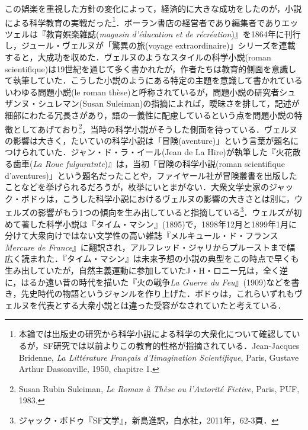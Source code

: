 この娯楽を重視した方針の変化によって，経済的に大きな成功をしたのが，小説による科学教育の実戦だった\footnote{本論では出版史の研究から科学小説による科学の大衆化について確認しているが，SF研究では以前よりこの教育的性格が指摘されている．Jean-Jacques Bridenne, \emph{La Littérature Français d'Iimagination Scientifique}, Paris, Gustave Arthur Dassonville, 1950, chapitre 1.}．ボーラン書店の経営者であり編集者でありエッツェルは『教育娯楽雑誌(\emph{magasin d'éducation et de récréation})』を1864年に刊行し，ジュール・ヴェルヌが「驚異の旅(voyage extraordinaire)」シリーズを連載すると，大成功を収めた．ヴェルヌのようなスタイルの科学小説(roman scientifique)は19世紀を通じて多く書かれたが，作者たちは教育的側面を意識して執筆していた．こうした小説のようにある特定の主題を意識して書かれているいわゆる問題小説(le roman thèse)と呼称されているが，問題小説の研究者シュザンヌ・シュレマン(Susan Suleiman)の指摘によれば，曖昧さを排して，記述が細部にわたる冗長さがあり，語の一義性に配慮しているという点を問題小説の特徴としてあげており\footnote{Susan Rubin Suleiman, \emph{Le Roman à Thèse ou l'Autorité Fictive}, Paris, PUF, 1983. }，当時の科学小説がそうした側面を待っている．ヴェルヌの影響は大きく，たいていの科学小説は「冒険(aventure)」という言葉が題名につけられていた．ジャン・ド・ラ・イール(Jean de La Hire)が執筆した『火花散る歯車(\emph{La Roue fulguratnte})』は，当初「冒険の科学小説(roman scientifique d'aventures)」という題名だったことや，ファイヤール社が冒険叢書を出版したことなどを挙げられるだろうが，枚挙にいとまがない．大衆文学史家のジャック・ボドゥは，こうした科学小説におけるヴェルヌの影響の大きさとは別に，ウェルズの影響がもう1つの傾向を生み出していると指摘している\footnote{ジャック・ボドゥ『SF文学』，新島進訳，白水社，2011年，62-3頁．}．ウェルズが初めて著した科学小説は『タイム・マシン』(1895)で，1898年12月と1899年1月に分けて大衆向けではない文学性の高い雑誌『メルキュール・ド・フランス\emph{Mercure de France}』に翻訳され，アルフレッド・ジャリからプルーストまで幅広く読まれた．『タイム・マシン』は未来予想の小説の典型をこの時点で早くも生み出していたが，自然主義運動に参加していたJ・H・ロニー兄は，全く逆に，はるか遠い昔の時代を描いた『火の戦争\emph{La Guerre du Feu}』(1909)などを書き，先史時代の物語というジャンルを作り上げた．ボドゥは，これらいずれもヴェルヌを代表とする大衆小説とは違った受容がなされていたと考えている．

